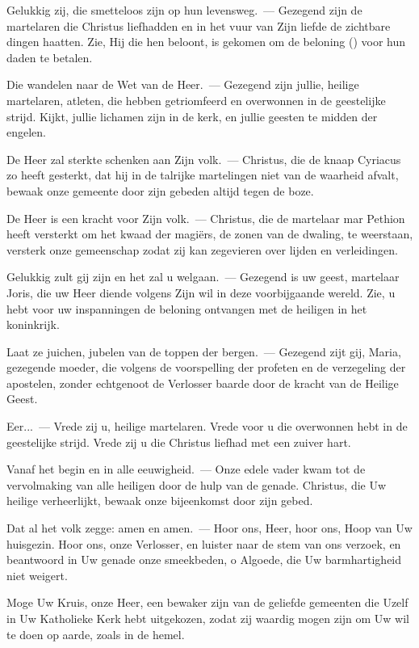 \documentclass[12pt,twoside,a5paper]{article}
\begin{document}
\begin{halfparskip}
  Gelukkig zij, die smetteloos zijn op hun levensweg.~--- Gezegend zijn de martelaren die Christus liefhadden en in het vuur van Zijn liefde de zichtbare dingen haatten. Zie, Hij die hen beloont, is gekomen om de beloning () voor hun daden te betalen.

  Die wandelen naar de Wet van de Heer.~--- Gezegend zijn jullie, heilige martelaren, atleten, die hebben getriomfeerd en overwonnen in de geestelijke strijd. Kijkt, jullie lichamen zijn in de kerk, en jullie geesten te midden der engelen.

  De Heer zal sterkte schenken aan Zijn volk.~--- Christus, die de knaap Cyriacus zo heeft gesterkt, dat hij in de talrijke martelingen niet van de waarheid afvalt, bewaak onze gemeente door zijn gebeden altijd tegen de boze.

  De Heer is een kracht voor Zijn volk.~--- Christus, die de martelaar mar Pethion heeft versterkt om het kwaad der magiërs, de zonen van de dwaling, te weerstaan, versterk onze gemeenschap zodat zij kan zegevieren over lijden en verleidingen.

  Gelukkig zult gij zijn en het zal u welgaan.~--- Gezegend is uw geest, martelaar Joris, die uw Heer diende volgens Zijn wil in deze voorbijgaande wereld. Zie, u hebt voor uw inspanningen de beloning ontvangen met de heiligen in het koninkrijk.

  Laat ze juichen, jubelen van de toppen der bergen.~--- Gezegend zijt gij, Maria, gezegende moeder, die volgens de voorspelling der profeten en de verzegeling der apostelen, zonder echtgenoot de Verlosser baarde door de kracht van de Heilige Geest.

  Eer...~--- Vrede zij u, heilige martelaren. Vrede voor u die overwonnen hebt in de geestelijke strijd. Vrede zij u die Christus liefhad met een zuiver hart.

  Vanaf het begin en in alle eeuwigheid.~--- Onze edele vader kwam tot de vervolmaking van alle heiligen door de hulp van de genade. Christus, die Uw heilige verheerlijkt, bewaak onze bijeenkomst door zijn gebed.

  Dat al het volk zegge: amen en amen.~--- Hoor ons, Heer, hoor ons, Hoop van Uw huisgezin. Hoor ons, onze Verlosser, en luister naar de stem van ons verzoek, en beantwoord in Uw genade onze smeekbeden, o Algoede, die Uw barmhartigheid niet weigert.

  Moge Uw Kruis, onze Heer, een bewaker zijn van de geliefde gemeenten die Uzelf in Uw Katholieke Kerk hebt uitgekozen, zodat zij waardig mogen zijn om Uw wil te doen op aarde, zoals in de hemel.


\end{halfparskip}
\end{document}
